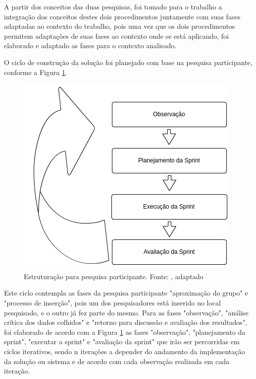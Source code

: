 A partir dos conceitos das duas pesquisas, foi tomado para o trabalho a integração dos conceitos destes dois procedimentos juntamente com suas fases adaptadas ao contexto do trabalho, pois uma vez que os dois procedimentos permitem adaptações de suas fases ao contexto onde se está aplicando, foi elaborado e adaptado as fases para o contexto analisado. 

O ciclo de construção da solução foi planejado com base na pesquisa participante, conforme a Figura \ref{figura_pesquisa_participante}. \clearpage

\begin{figure}[!htb]
	\centering
	\includegraphics[scale=0.6]{figuras/Fases_pesquisa_participante}
	\caption{Estruturação para pesquisa participante. Fonte: \cite{costaSantosTrevisan}, adaptado}
	\label{figura_pesquisa_participante}
\end{figure}

 Este ciclo contempla as fases da pesquisa participante "aproximação do grupo" e "processo de inserção", pois um dos pesquisadores está inserido no local pesquisado, e o outro já fez parte do mesmo. Para as fases "observação", "análise crítica dos dados colhidos" e "retorno para discussão e avaliação dos resultados", foi elaborado de acordo com a Figura \ref{figura_pesquisa_participante} as fases "observação", "planejamento da sprint", "executar a sprint" e "avaliação da sprint" que irão ser percorridas em ciclos iterativos, sendo n iterações a depender do andamento da implementação da solução ou sistema e de acordo com cada observação realizada em cada iteração.

